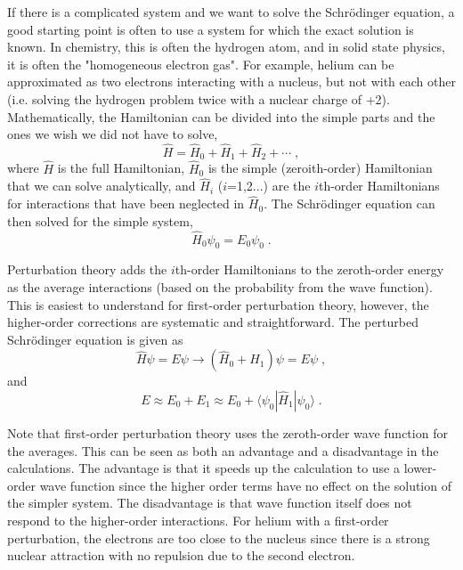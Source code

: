 \documentclass[12pt]{report}
\begin{document}
If there is a complicated system and we want to solve the Schr\"{o}dinger 
equation, a good starting point is often to use a system for which the exact
solution is known. In chemistry, this is often the hydrogen atom, and in solid
state physics, it is often the "homogeneous electron gas". For example, helium
can be approximated as two electrons interacting with a nucleus, but not with
each other (i.e. solving the hydrogen problem twice with a nuclear charge of
+2). \\

Mathematically, the Hamiltonian can be divided into the simple parts and the
ones we wish we did not have to solve,
\begin{equation}
 \hat H = \hat H_0+\hat H_1+\hat H_2+\cdots \; ,
\end{equation}
where $\hat H$ is the full Hamiltonian, $\hat H_0$ is the simple
(zeroith-order) Hamiltonian that we can solve analytically, and $\hat H_i$
($i$=1,2...) are the $i$th-order Hamiltonians for interactions that have been
neglected in $\hat H_0$. The Schr\"{o}dinger equation can then solved for the
simple system,
\begin{equation}
 \hat H_0\psi_0=E_0\psi_0 \; .
\end{equation}

Perturbation theory adds the $i$th-order Hamiltonians to the zeroth-order
energy as the average interactions (based on the probability from the
wave function). This is easiest to understand for first-order perturbation
theory, however, the higher-order corrections are systematic and
straightforward. The perturbed Schr\"{o}dinger equation is given as
\begin{equation}
 \hat H\psi=E\psi \to (\hat H_0 + \hat H_1)\psi = E\psi \; , 
\end{equation}
and
\begin{equation}
 E \approx E_0 + E_1 \approx E_0 + \langle\psi_0|\hat H_1|\psi_0\rangle \; .
\end{equation}

Note that first-order perturbation theory uses the zeroth-order wave 
function for the averages. This can be seen as both an advantage and a
disadvantage in the calculations. The advantage is that it speeds up the
calculation to use a lower-order wave function since the higher order terms
have no effect on the solution of the simpler system. The disadvantage is that
wave function itself does not respond to the higher-order interactions. For
helium with a first-order perturbation, the electrons are too close to the
nucleus since there is a strong nuclear attraction with no repulsion due to
the second electron. \\
\end{document}
